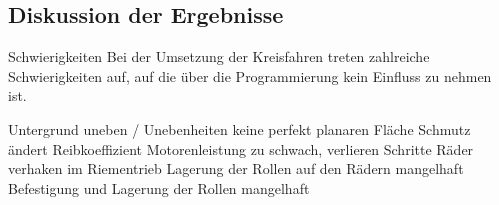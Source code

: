 \documentclass[a4paper]{article}
\begin{document}
\subsection{Diskussion der Ergebnisse}
Schwierigkeiten
Bei der Umsetzung der Kreisfahren treten zahlreiche Schwierigkeiten auf, auf die über die Programmierung kein Einfluss zu nehmen ist.

Untergrund uneben / Unebenheiten
keine perfekt planaren Fläche
Schmutz ändert Reibkoeffizient
Motorenleistung zu schwach, verlieren Schritte
Räder verhaken im Riementrieb
Lagerung der Rollen auf den Rädern mangelhaft
Befestigung und Lagerung der Rollen mangelhaft
\end{document}
